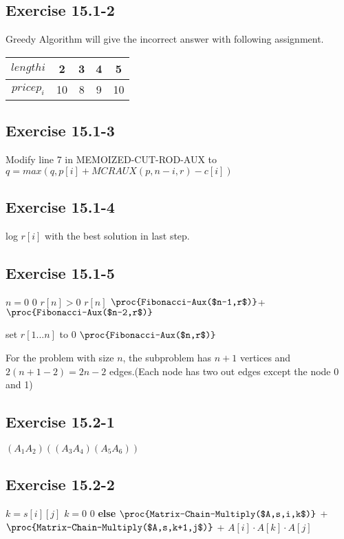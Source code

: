\documentclass[12pt]{article}
\theoremstyle{definition}
\theoremstyle{remark}
\begin{document}
\subsection*{Exercise 15.1-2}
Greedy Algorithm will give the incorrect answer with following assignment.
\begin{tabular}{c|c|c|c|c}\hline
$length i$ & 2 & 3 & 4 & 5\\ \hline
$price p_i$ & 10 & 8 & 9 & 10\\ \hline
\end{tabular}
\subsection*{Exercise 15.1-3}
Modify line 7 in MEMOIZED-CUT-ROD-AUX to $q=max(q,p[i]+MCRAUX(p,n-i,r)-c[i])$
\subsection*{Exercise 15.1-4}
log $r[i]$ with the best solution in last step.
\subsection*{Exercise 15.1-5}
\begin{codebox}
\li \If $n=0$ \label{li:if}
\li \quad \Return $0$
\li \If $r[n]>0$ \label{li:if}
\li \quad \Return $r[n]$
\li \Return $\proc{Fibonacci-Aux($n-1,r$)}$+$\proc{Fibonacci-Aux($n-2,r$)}$
\end{codebox}
\begin{codebox}
\li set $r[1...n]$ to 0
\li \Return $\proc{Fibonacci-Aux($n,r$)}$
\end{codebox}
For the problem with size $n$, the subproblem has $n+1$ vertices and $2(n+1-2)=2n-2$ edges.(Each node has two out edges except the node 0 and 1)
\subsection*{Exercise 15.2-1}
$(A_1A_2)((A_3A_4)(A_5A_6))$
\subsection*{Exercise 15.2-2}
\begin{codebox}
\li $k=s[i][j]$
\li \If $k=0$ \label{li:if}
\li \quad \Return $0$
\li \textbf{else}
\li \quad \Return $\proc{Matrix-Chain-Multiply($A,s,i,k$)}$ +
\li \quad $\proc{Matrix-Chain-Multiply($A,s,k+1,j$)}$ +
\li \quad $A[i]\cdot A[k]\cdot A[j]$
\end{codebox}
\end{document}
